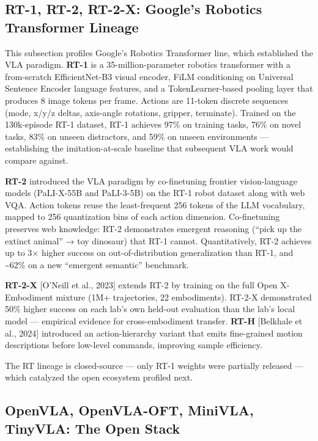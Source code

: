 \documentclass{article}
\begin{document}
\subsection{RT-1, RT-2, RT-2-X: Google's Robotics Transformer Lineage}\label{rt-1-rt-2-rt-2-x-googles-robotics-transformer-lineage}

This subsection profiles Google's Robotics Transformer line, which established the VLA paradigm. \textbf{RT-1} \cite{brohan2023rt2visionlanguagea} is a 35-million-parameter robotics transformer with a from-scratch EfficientNet-B3 visual encoder, FiLM conditioning on Universal Sentence Encoder language features, and a TokenLearner-based pooling layer that produces 8 image tokens per frame. Actions are 11-token discrete sequences (mode, x/y/z deltas, axis-angle rotations, gripper, terminate). Trained on the 130k-episode RT-1 dataset, RT-1 achieves 97\% on training tasks, 76\% on novel tasks, 83\% on unseen distractors, and 59\% on unseen environments --- establishing the imitation-at-scale baseline that subsequent VLA work would compare against.

\textbf{RT-2} \cite{brohan2023rt2visionlanguagea} introduced the VLA paradigm by co-finetuning frontier vision-language models (PaLI-X-55B and PaLI-3-5B) on the RT-1 robot dataset along with web VQA. Action tokens reuse the least-frequent 256 tokens of the LLM vocabulary, mapped to 256 quantization bins of each action dimension. Co-finetuning preserves web knowledge: RT-2 demonstrates emergent reasoning (``pick up the extinct animal'' → toy dinosaur) that RT-1 cannot. Quantitatively, RT-2 achieves up to 3× higher success on out-of-distribution generalization than RT-1, and \textasciitilde62\% on a new ``emergent semantic'' benchmark.

\textbf{RT-2-X} {[}O'Neill et al., 2023{]} extends RT-2 by training on the full Open X-Embodiment mixture (1M+ trajectories, 22 embodiments). RT-2-X demonstrated 50\% higher success on each lab's own held-out evaluation than the lab's local model --- empirical evidence for cross-embodiment transfer. \textbf{RT-H} {[}Belkhale et al., 2024{]} introduced an action-hierarchy variant that emits fine-grained motion descriptions before low-level commands, improving sample efficiency.

The RT lineage is closed-source --- only RT-1 weights were partially released --- which catalyzed the open ecosystem profiled next.

\subsection{OpenVLA, OpenVLA-OFT, MiniVLA, TinyVLA: The Open Stack}\label{openvla-openvla-oft-minivla-tinyvla-the-open-stack}
\end{document}
